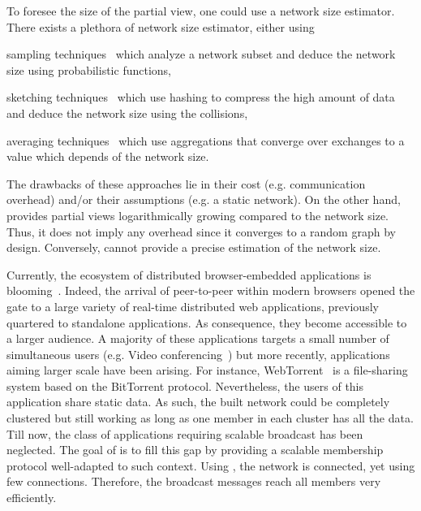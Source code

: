 To foresee the size of the partial view, one could use a network size
estimator. There exists a plethora of network size estimator, either using
\begin{inparaenum}[(i)]
\item sampling techniques~\cite{mane05network, ganesh2007peer,
    kostoulas2007active} which analyze a network subset and deduce the network
  size using probabilistic functions,
\item sketching techniques~\cite{flajolet2008hyperloglog, baquero2012extrema}
  which use hashing to compress the high amount of data and deduce the network
  size using the collisions,
\item averaging techniques~\cite{jelasity2004epidemic, blasa2011symmetric}
  which use aggregations that converge over exchanges to a value which depends
  of the network size.
\end{inparaenum}
The drawbacks of these approaches lie in their cost (e.g. communication
overhead) and/or their assumptions (e.g. a static network). On the other hand,
\SCAMPLON{} provides partial views logarithmically growing compared to the
network size. Thus, it does not imply any overhead since it converges to a
random graph by design. Conversely, \SCAMPLON{} cannot provide a precise
estimation of the network size.

Currently, the ecosystem of distributed browser-embedded applications is
blooming~\cite{firefoxhello, sharefest, webtorrent}. Indeed, the arrival of
peer-to-peer within modern browsers opened the gate to a large variety of
real-time distributed web applications, previously quartered to standalone
applications. As consequence, they become accessible to a larger audience. A
majority of these applications targets a small number of simultaneous users
(e.g. Video conferencing~\cite{firefoxhello}) but more recently, applications
aiming larger scale have been arising. For instance,
WebTorrent~\cite{webtorrent} is a file-sharing system based on the BitTorrent
protocol. Nevertheless, the users of this application share static data. As
such, the built network could be completely clustered but still working as long
as one member in each cluster has all the data.  Till now, the class of
applications requiring scalable broadcast has been neglected. The goal of
\SCAMPLON{} is to fill this gap by providing a scalable membership protocol
well-adapted to such context. Using \SCAMPLON{}, the network is connected, yet
using few connections. Therefore, the broadcast messages reach all members very
efficiently.


